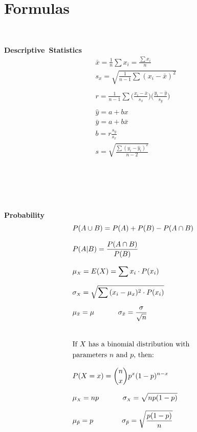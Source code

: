 
\section{Formulas}
\label{formulas}

\ \\[0mm]

\noindent%
\begin{minipage}[l]{0.32\textwidth}
\noindent%
\textbf{Descriptive~Statistics}
\begin{align*}
&\bar{x} =\frac{1}{n}\sum{x_i}=\frac{\sum{x_i}}{n} \\[3.5mm]
&s_x = \sqrt{\frac{1}{n-1}\sum{(x_i-\bar{x})^2}} \\ \\[3.5mm]
&r = \frac{1}{n-1}
    \sum{\Big(\frac{x_i-\bar{x}}{s_x}\Big)
    \Big(\frac{y_i-\bar{y}}{s_y}\Big)} \\ \\[3.5mm]
&\hat{y} = a+bx \\[3.5mm]
&\bar{y} = a + b\bar{x} \\[3.5mm]
&b = r\frac{s_y}{s_x} \\[3.5mm]
& s=\sqrt{\frac{\sum{(y_i-\hat{y}_i)^2}}{n-2}}
\end{align*}
\ \vspace{3mm}

\ 
\end{minipage}
\begin{minipage}[l]{0.13\textwidth}
\ 
\end{minipage}
\begin{minipage}[l]{0.35\textwidth}
\noindent%
\textbf{Probability}
\begin{align*}
&P(A \cup B) = P(A) + P(B) - P(A\cap B) \\[2.5mm]
&P(A | B) = \frac{P(A \cap B)}{P(B)} \\[2.5mm]
&\mu_{\scriptscriptstyle{X}}=E(X)=\sum{x_i\cdot  P(x_i)} \\[2.5mm]
&\sigma_{\scriptscriptstyle{X}}=\sqrt{\sum{(x_i-\mu_x)^2\cdot P(x_i)}} \\[2.5mm]
&\mu_{\bar{x}}
    = \mu \qquad \quad
        \ \sigma_{\bar{x}} = \frac{\sigma}{\sqrt{n}} \\[8mm]
&\text{If $X$ has a binomial distribution with} \\
&\text{parameters $n$ and $p$, then:} \\[2.5mm]
&P(X=x)={n\choose x} p^x(1-p)^{n-x} \\[2.5mm]
&\mu_{\scriptscriptstyle{X}}=np \qquad \quad  \ \sigma_{\scriptscriptstyle{X}}=\sqrt{np(1-p)} \\[2.5mm]
&\mu_{\hat{p}}
    = p\qquad \qquad
        \small{\sigma_{\hat{p}}=\sqrt{\frac{p(1-p)}{n}}}
\end{align*}
\end{minipage} \\[8mm]

